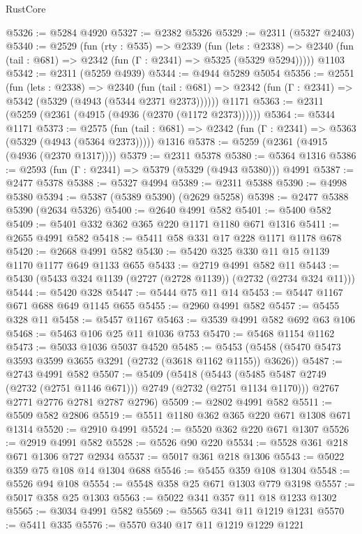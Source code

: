 \begin{lexlean}{RustCore}
\begin{coremodule}
@5326 := @5284 @4920
@5327 := @2382 @5326
@5329 := @2311 (@5327 @2403)
@5340 := @2529
    (fun (rty : @535) =>
    @2339
      (fun (lets : @2338) =>
      @2340 (fun (tail : @681) => @2342 (fun (Γ : @2341) => @5325 (@5329 @5294)))))
    @1103
@5342 := @2311 (@5259 @4939)
@5344 := @4944 @5289 @5054
@5356 := @2551
    (fun (lets : @2338) =>
    @2340
      (fun (tail : @681) => @2342 (fun (Γ : @2341) => @5342 (@5329 (@4943 (@5344 @2371 @2373))))))
    @1171
@5363 := @2311 (@5259 (@2361 (@4915 (@4936 (@2370 (@1172 @2373))))))
@5364 := @5344 @1171
@5373 := @2575
    (fun (tail : @681) => @2342 (fun (Γ : @2341) => @5363 (@5329 (@4943 (@5364 @2373)))))
    @1316
@5378 := @5259 (@2361 (@4915 (@4936 (@2370 @1317))))
@5379 := @2311 @5378
@5380 := @5364 @1316
@5386 := @2593 (fun (Γ : @2341) => @5379 (@5329 (@4943 @5380))) @4991
@5387 := @2477 @5378
@5388 := @5327 @4994
@5389 := @2311 @5388
@5390 := @4998 @5380
@5394 := @5387 (@5389 @5390) (@2629 @5258)
@5398 := @2477 @5388 @5390 (@2634 @5326)
@5400 := @2640 @4991 @582
@5401 := @5400 @582
@5409 := @5401 @332 @362 @365 @220 @1171 @1180 @671 @1316
@5411 := @2655 @4991 @582
@5418 := @5411 @58 @331 @17 @228 @1171 @1178 @678
@5420 := @2668 @4991 @582
@5430 := @5420 @325 @330 @11 @15 @1139 @1170 @1177 @649 @1133 @655
@5433 := @2719 @4991 @582 @11
@5443 := @5430 (@5433 @324 @1139 (@2727 (@2728 @1139)) (@2732 (@2734 @324 @11)))
@5444 := @5420 @328
@5447 := @5444 @75 @11 @14
@5453 := @5447 @1167 @671 @688 @649 @1145 @655
@5455 := @2960 @4991 @582
@5457 := @5455 @328 @11
@5458 := @5457 @1167
@5463 := @3539 @4991 @582 @692 @63 @106
@5468 := @5463 @106 @25 @11 @1036 @753
@5470 := @5468 @1154 @1162
@5473 := @5033 @1036 @5037 @4520
@5485 := @5453 (@5458 (@5470 @5473 @3593 @3599 @3655 @3291 (@2732 (@3618 @1162 @1155)) @3626))
@5487 := @2743 @4991 @582
@5507 := @5409
    (@5418
      (@5443 (@5485 @5487 @2749 (@2732 (@2751 @1146 @671))) @2749 (@2732 (@2751 @1134 @1170)))
      @2767
      @2771
      @2776
      @2781
      @2787
      @2796)
@5509 := @2802 @4991 @582
@5511 := @5509 @582 @2806
@5519 := @5511 @1180 @362 @365 @220 @671 @1308 @671 @1314
@5520 := @2910 @4991
@5524 := @5520 @362 @220 @671 @1307
@5526 := @2919 @4991 @582
@5528 := @5526 @90 @220
@5534 := @5528 @361 @218 @671 @1306 @727 @2934
@5537 := @5017 @361 @218 @1306
@5543 := @5022 @359 @75 @108 @14 @1304 @688
@5546 := @5455 @359 @108 @1304
@5548 := @5526 @94 @108
@5554 := @5548 @358 @25 @671 @1303 @779 @3198
@5557 := @5017 @358 @25 @1303
@5563 := @5022 @341 @357 @11 @18 @1233 @1302
@5565 := @3034 @4991 @582
@5569 := @5565 @341 @11 @1219 @1231
@5570 := @5411 @335
@5576 := @5570 @340 @17 @11 @1219 @1229 @1221

\end{coremodule}
\end{lexlean}
